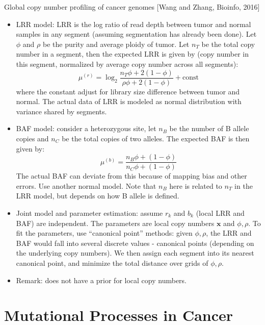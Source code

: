 \documentclass{report}
\begin{document}
Global copy number profiling of cancer genomes [Wang and Zhang, Bioinfo, 2016]
\begin{itemize}
	\item LRR model: LRR is the log ratio of read depth between tumor and normal samples in any segment (assuming segmentation has already been done). Let $\phi$ and $\rho$ be the purity and average ploidy of tumor. Let $n_T$ be the total copy number in a segment, then the expected LRR is given by (copy number in this segment, normalized by average copy number across all segments): 
	\begin{equation}
	\mu^{(r)} = \log_2 \frac{n_T \phi + 2 (1-\phi)}{\rho \phi + 2(1-\phi)} + \text{const}
	\end{equation}
	where the constant adjust for library size difference between tumor and normal. The actual data of LRR is modeled as normal distribution with variance shared by segments. 
	
	\item BAF model: consider a heterozygous site, let $n_B$ be the number of B allele copies and $n_C$ be the total copies of two alleles. The expected BAF is then given by: 
	\begin{equation}
	\mu^{(b)} = \frac{n_B \phi + (1-\phi)}{n_C \phi + (1-\phi)}
	\end{equation}
	The actual BAF can deviate from this because of mapping bias and other errors. Use another normal model. Note that $n_B$ here is related to $n_T$ in the LRR model, but depends on how B allele is defined. 
	
	\item Joint model and parameter estimation: assume $r_k$ and $b_k$ (local LRR and BAF) are independent. The parameters are local copy numbers $\mathbf{x}$ and $\phi, \rho$. To fit the parameters, use ``canonical point'' methods: given $\phi, \rho$, the LRR and BAF would fall into several discrete values - canonical points (depending on the underlying copy numbers). We then assign each segment into its nearest canonical point, and minimize the total distance over grids of $\phi, \rho$. 
	
	\item Remark: does not have a prior for local copy numbers.  
\end{itemize}
\section{Mutational Processes in Cancer}
\end{document}
